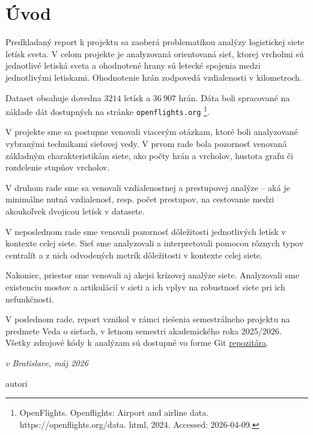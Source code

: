 
\chapter*{Úvod}

Predkladaný report k projektu sa zaoberá problematikou analýzy logistickej siete letísk sveta.
V celom projekte je analyzovaná orientovaná sieť, ktorej vrcholmi sú jednotlivé letiská sveta 
a ohodnotené hrany sú letecké spojenia medzi jednotlivými letiskami. Ohodnotenie hrán zodpovedá vzdialenosti v kilometroch.

Dataset obsahuje dovedna $3214$ letísk a $36 \> 907$ hrán. Dáta boli spracované na základe dát dostupných na stránke \texttt{openflights.org} \footnote{OpenFlights. Openflights: Airport and airline data. https://openflights.org/data.
html, 2024. Accessed: 2026-04-09.}.

V projekte sme sa postupne venovali viacerým otázkam, ktoré boli analyzované vybranými technikami sieťovej vedy.
V prvom rade bola pozornosť venovaná základným charakteristikám siete, ako počty hrán a vrcholov, hustota grafu či rozdelenie stupňov vrcholov.

V druhom rade sme sa venovali vzdialenostnej a prestupovej analýze -- aká je minimálne nutná vzdialenosť, resp. počet prestupov, na cestovanie medzi akoukoľvek dvojicou 
letísk v datasete.

V neposlednom rade sme venovali pozornosť dôležitosti jednotlivých letísk v kontexte celej siete. Sieť sme analyzovali a interpretovali pomocou rôznych typov centralít a z nich odvodených metrík dôležitosti
v kontexte celej siete.

Nakoniec, priestor sme venovali aj akejsi krízovej analýze siete. Analyzovali sme existenciu mostov a artikulácií v sieti a ich vplyv na robustnosť siete pri ich nefunkčnosti.

V poslednom rade, report vznikol v rámci riešenia semestrálneho projektu na predmete Veda o sieťach, v letnom semestri akademického roka 2025/2026. Všetky zdrojové kódy k analýzam 
sú dostupné vo forme Git \href{https://github.com/sugy-w/Veda-o-sietach-Projekt-JPD-}{\underline{repozitára}}.

\begin{flushright}
\textit{v Bratislave, máj 2026}
\par
autori
\end{flushright}

\tableofcontents

\clearpage
